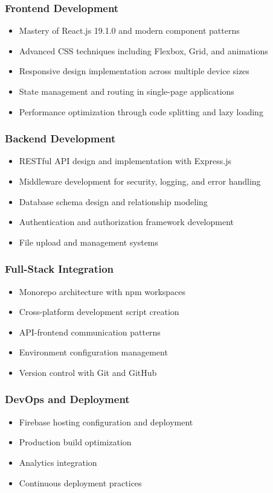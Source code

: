 \documentclass[12pt,a4paper]{report}
\begin{document}
\subsubsection*{Frontend Development}
\begin{itemize}
    \item Mastery of React.js 19.1.0 and modern component patterns
    \item Advanced CSS techniques including Flexbox, Grid, and animations
    \item Responsive design implementation across multiple device sizes
    \item State management and routing in single-page applications
    \item Performance optimization through code splitting and lazy loading
\end{itemize}

\subsubsection*{Backend Development}
\begin{itemize}
    \item RESTful API design and implementation with Express.js
    \item Middleware development for security, logging, and error handling
    \item Database schema design and relationship modeling
    \item Authentication and authorization framework development
    \item File upload and management systems
\end{itemize}

\subsubsection*{Full-Stack Integration}
\begin{itemize}
    \item Monorepo architecture with npm workspaces
    \item Cross-platform development script creation
    \item API-frontend communication patterns
    \item Environment configuration management
    \item Version control with Git and GitHub
\end{itemize}

\subsubsection*{DevOps and Deployment}
\begin{itemize}
    \item Firebase hosting configuration and deployment
    \item Production build optimization
    \item Analytics integration
    \item Continuous deployment practices
\end{itemize}
\end{document}
